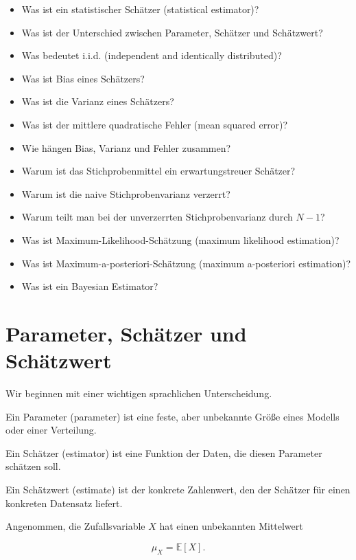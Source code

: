 \begin{itemize}
    \item Was ist ein statistischer Schätzer (statistical estimator)?
    \item Was ist der Unterschied zwischen Parameter, Schätzer und Schätzwert?
    \item Was bedeutet i.i.d. (independent and identically distributed)?
    \item Was ist Bias eines Schätzers?
    \item Was ist die Varianz eines Schätzers?
    \item Was ist der mittlere quadratische Fehler (mean squared error)?
    \item Wie hängen Bias, Varianz und Fehler zusammen?
    \item Warum ist das Stichprobenmittel ein erwartungstreuer Schätzer?
    \item Warum ist die naive Stichprobenvarianz verzerrt?
    \item Warum teilt man bei der unverzerrten Stichprobenvarianz durch \(N-1\)?
    \item Was ist Maximum-Likelihood-Schätzung (maximum likelihood estimation)?
    \item Was ist Maximum-a-posteriori-Schätzung (maximum a-posteriori estimation)?
    \item Was ist ein Bayesian Estimator?
\end{itemize}

\section{Parameter, Schätzer und Schätzwert}

Wir beginnen mit einer wichtigen sprachlichen Unterscheidung.

\begin{definitionbox}
Ein Parameter (parameter) ist eine feste, aber unbekannte Größe eines Modells oder einer Verteilung.

Ein Schätzer (estimator) ist eine Funktion der Daten, die diesen Parameter schätzen soll.

Ein Schätzwert (estimate) ist der konkrete Zahlenwert, den der Schätzer für einen konkreten Datensatz liefert.
\end{definitionbox}

Angenommen, die Zufallsvariable \(X\) hat einen unbekannten Mittelwert

\[
    \mu_X = \mathbb{E}[X].
\]

